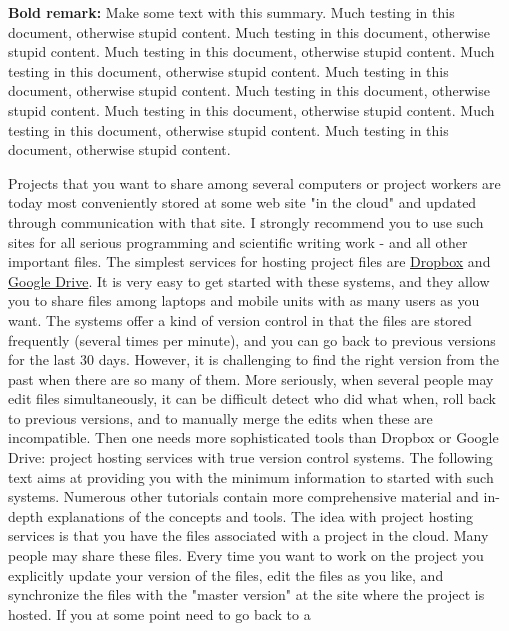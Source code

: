 \documentclass[%
oneside,                 %
final,                   %
10pt]{article}
\newenvironment{summary_mdfboxadmon}[1][]{
\begin{summary_mdfboxmdframed}[frametitle=#1]
}
{
\end{summary_mdfboxmdframed}
}
\theoremstyle{definition}
\begin{document}
\begin{enumerate}
\begin{summary_mdfboxadmon}[Summary.]
\textbf{Bold remark:} Make some text with this summary.
Much testing in this document, otherwise stupid content.
Much testing in this document, otherwise stupid content.
Much testing in this document, otherwise stupid content.
Much testing in this document, otherwise stupid content.
Much testing in this document, otherwise stupid content.
Much testing in this document, otherwise stupid content.
Much testing in this document, otherwise stupid content.
Much testing in this document, otherwise stupid content.
Much testing in this document, otherwise stupid content.
\end{summary_mdfboxadmon} %


Projects that you want to share among several computers or project
workers are today most conveniently stored at some web site "in the
cloud" and updated through communication with that site. I strongly
recommend you to use such sites for all serious programming and
scientific writing work - and all other important files.
The simplest services for hosting project files are \href{{https://dropbox.com}}{Dropbox} and \href{{https://drive.google.com}}{Google Drive}.
It is very easy to get started with these systems, and they allow you
to share files among laptops and mobile units with as many users as
you want. The systems offer a kind of version control in that the
files are stored frequently (several times per minute), and you can go
back to previous versions for the last 30 days. However, it is
challenging  to find the right version from the past when there are
so many of them.
More seriously, when several people may edit files simultaneously, it
can be difficult detect who did what when, roll back to previous
versions, and to manually merge the edits when these are
incompatible. Then one needs more sophisticated tools than Dropbox or
Google Drive: project hosting services with true version control
systems.  The following text aims at providing you with the minimum
information to started with such systems. Numerous other tutorials
contain more comprehensive material and in-depth explanations of the
concepts and tools.
The idea with project hosting services is that you have the files
associated with a project in the cloud. Many people may share these
files.  Every time you want to work on the project you explicitly
update your version of the files, edit the files as you like, and
synchronize the files with the "master version" at the site where the
project is hosted.  If you at some point need to go back to a

\end{enumerate}
\end{document}
